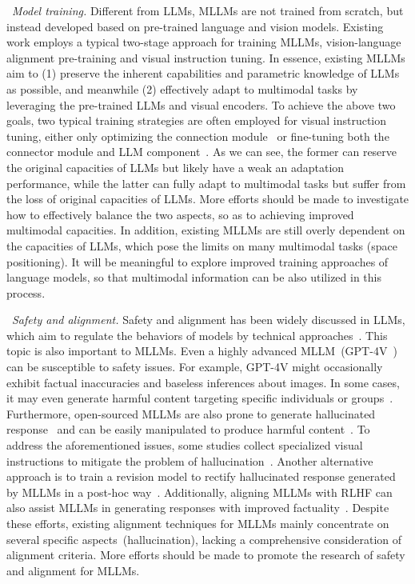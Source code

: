 {\textbullet~\emph{Model training.} Different from LLMs, MLLMs are not trained from scratch, but instead developed based on pre-trained language and vision models. Existing work employs a typical two-stage  approach for training MLLMs, \ie vision-language alignment pre-training and visual instruction tuning. 
In essence,  existing MLLMs aim to (1) preserve the inherent capabilities and parametric knowledge of LLMs as possible, and meanwhile (2) effectively adapt to  multimodal tasks by leveraging the pre-trained LLMs and visual encoders.   
 To achieve the above two goals, two typical  training strategies are often employed for visual instruction tuning, either only optimizing the connection module~\cite{Dai-2023-arxiv-InstructBLIP} or fine-tuning  both the connector module and LLM component~\cite{Liu-2023-arxiv-Visual}. 
 As we can see, the former can reserve  the original capacities of LLMs but likely have a weak an adaptation performance, while the latter can fully adapt to multimodal tasks but suffer from the loss of original capacities of LLMs.
 More efforts should be made to investigate how to effectively balance the two aspects, so as to achieving improved multimodal capacities.
 In addition, existing MLLMs are still overly dependent on the capacities of LLMs, which pose the limits on many multimodal tasks (\eg space positioning). 
 It will be meaningful to explore  improved training approaches of language models, so that multimodal information can be also utilized in  this process.     


%


\textbullet~\emph{Safety and alignment.}
{
Safety and alignment has been widely discussed in LLMs, which aim to regulate the behaviors of models by technical approaches~\cite{Ouyang-arxiv-2022-Training}. This topic is also important to MLLMs. 
Even a highly advanced MLLM~(\eg GPT-4V~\cite{OpenAI-OpenAI-2023-GPT-4v}) can be susceptible to safety issues. For example, GPT-4V might occasionally exhibit   factual inaccuracies and baseless inferences about images. In some cases, it may even generate harmful content targeting specific individuals or groups~\cite{OpenAI-OpenAI-2023-GPT-4v}. Furthermore,  open-sourced MLLMs are also prone to generate hallucinated response~\cite{Li-emnlp-2023-evaluating} and can be easily manipulated to produce harmful content~\cite{Qi-2023-NAML-Visual}. To address the aforementioned issues, some studies collect  specialized visual instructions to mitigate the problem of hallucination~\cite{liu-arxiv-2023-aligning}. Another alternative approach is to train a revision model to rectify hallucinated response generated by MLLMs in a post-hoc way~\cite{Zhou-arxiv-2023-analyzing}. Additionally, aligning MLLMs with RLHF can also assist MLLMs in generating responses with improved factuality~\cite{Sun-arxiv-2023-Aligning}. Despite these efforts, existing alignment techniques for  MLLMs mainly concentrate on  several specific aspects~(\eg hallucination), lacking a  comprehensive consideration of alignment criteria. 
More efforts should be made to promote the research of safety and alignment for MLLMs. 
}



}
